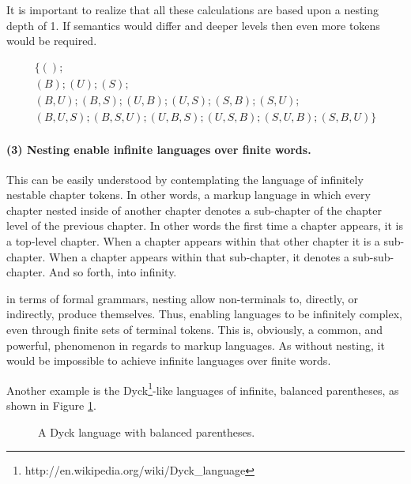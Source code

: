 \documentclass{scrreprt}
\begin{document}
It is important to realize that all these calculations are based upon a nesting depth of 1. If semantics would differ and deeper levels then even more tokens would be required.




\begin{equation}
\begin{split}
\{
(); \\
(B);
(U);
(S); \\
(B,U);
(B,S);
(U,B);
(U,S);
(S,B);
(S,U); \\
(B,U,S);
(B,S,U);
(U,B,S);
(U,S,B);
(S,U,B);
(S,B,U)
\}
\label{eq:all-tuples}
\end{split}
\end{equation}






\paragraph{(3) Nesting enable infinite languages over finite words.}
This can be easily understood by contemplating the language of infinitely nestable chapter tokens. In other words, a markup language in which every chapter nested inside of another chapter denotes a sub-chapter of the chapter level of the previous chapter. In other words the first time a chapter appears, it is a top-level chapter. When a chapter appears within that other chapter it is a sub-chapter. When a chapter appears within that sub-chapter, it denotes a sub-sub-chapter. And so forth, into infinity.

in terms of formal grammars, nesting allow non-terminals to, directly, or indirectly, produce themselves. Thus, enabling languages to be infinitely complex, even through finite sets of terminal tokens. This is, obviously, a common, and powerful, phenomenon in regards to markup languages. As without nesting, it would be impossible to achieve infinite languages over finite words.

Another example is the Dyck\footnote{http://en.wikipedia.org/wiki/Dyck\_language}-like languages of infinite, balanced parentheses, as shown in Figure \ref{fig:mixed-content-nesting}.



\begin{figure}[h]
\centering
{}
\caption{A Dyck language with balanced parentheses.}
\label{fig:mixed-content-nesting}
\end{figure}
\end{document}
